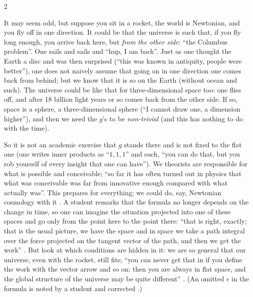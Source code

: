 \begin{paracol}{2}
\begin{example}\label{ex:nd-rocket}
It may seem odd, but suppose you sit in a rocket, the world is Newtonian, and you fly off in one direction. It could be that the universe is such that, if you fly long enough, you arrive back here, but \emph{from the other side}: ``the Columbus problem''. One sails and sails and ``hup, I am back''. Just as one thought the Earth a disc and was then surprised (``this was known in antiquity, people were better''), one does not naively
assume that going on in one direction one comes back from behind; but we know that it is so on the Earth (without ocean and such). The universe could be like that for three-dimensional space too: one flies off, and after 18 billion light years or so comes back from the other side. If so, space is a sphere, a three-dimensional sphere (``I cannot draw one, a dimension higher''), and then we need the $g$'s to be \emph{non-trivial}
(and this has nothing to do with the time). 
\end{example}
So it is not an academic exercise that $g$ stands there and is not fixed to the flat one (one writes inner products as ``$1,1,1$'' and such, ``you can do that, but you rob yourself of every insight that one can have''). We theorists are responsible for what is possible and conceivable; ``so far it has often turned out in physics that what was conceivable was far from innovative enough compared with what actually was''.
This prepares for everything; we could do, say, Newtonian cosmology with it . A student remarks that the formula no longer depends on the change in time, so one can imagine the situation projected into one of these spaces and go only from the point here to the point there: ``that is right, exactly; that is the usual picture, we have the space and in space we take a path integral over the force
projected on the tangent vector of the path, and then we get the work'' . But look at which conditions are hidden in it: we are so general that our universe, even with the rocket, still fits; ``you can never get that in if you define the work with the vector arrow and so on: then you are always in flat space, and the global structure of the universe may be quite different'' .
(An omitted $\epsilon$ in the formula is noted by a student and corrected .)


\end{paracol}
